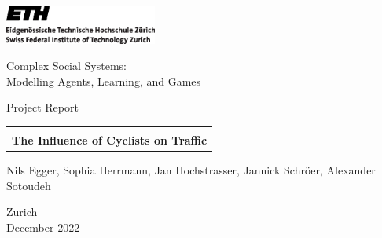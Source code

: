 \thispagestyle{empty}

\begin{center}
\includegraphics[width=5cm]{ETHlogo.eps}

\bigskip


\bigskip


\bigskip


\LARGE{Complex Social Systems:\\ }
\LARGE{ Modelling Agents, Learning, and Games\\}

\bigskip

\bigskip

\small{Project Report}\\

\bigskip

\bigskip

\bigskip

\bigskip


\begin{tabular}{|c|}
\hline
\\
\textbf{\LARGE{The Influence of Cyclists on Traffic}}
\\
\hline
\end{tabular}
\bigskip

\bigskip

\bigskip

\LARGE{Nils Egger, Sophia Herrmann, Jan Hochstrasser, Jannick Schröer, Alexander Sotoudeh}



\bigskip

\bigskip

\bigskip

\bigskip

\bigskip

\bigskip

\bigskip

\bigskip

Zurich\\
December 2022\\

\end{center}